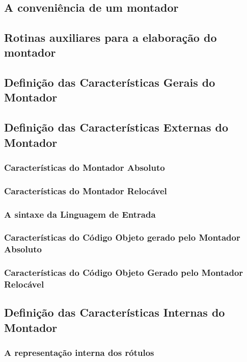 \documentclass[a4paper,12pt]{article}
\begin{document}
\par
\an{[...]}\\

\subsection{A conveniência de um montador}

\subsection{Rotinas auxiliares para a elaboração do montador}

\subsection{Definição das Características Gerais do Montador}

\subsection{Definição das Características Externas do Montador}

\subsubsection{Características do Montador Absoluto}
\subsubsection{Características do Montador Relocável}
\subsubsection{A sintaxe da Linguagem de Entrada}
\subsubsection{Características do Código Objeto gerado pelo Montador Absoluto}
\subsubsection{Características do Código Objeto Gerado pelo Montador Relocável}

\subsection{Definição das Características Internas do Montador}

\subsubsection{A representação interna dos rótulos}
\end{document}
